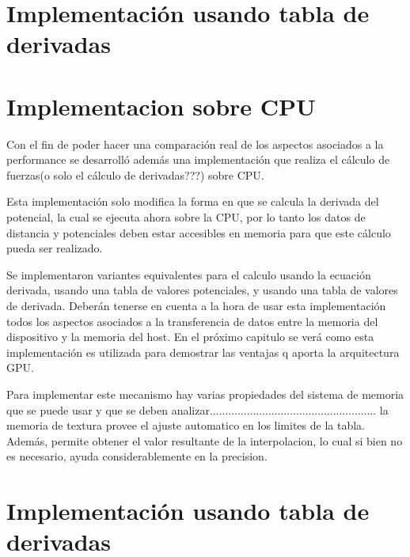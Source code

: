 \section{Implementación usando tabla de derivadas}
\section{Implementacion sobre CPU}
Con el fin de poder hacer una comparación real de los aspectos asociados a la performance se desarrolló además una implementación que realiza el cálculo de fuerzas(o solo el cálculo de derivadas???) sobre CPU.

Esta implementación solo modifica la forma en que se calcula la derivada del potencial, la cual se ejecuta ahora sobre la CPU, por lo tanto los datos de distancia y potenciales deben estar accesibles en memoria para que este cálculo pueda ser realizado.

Se implementaron variantes equivalentes para el calculo usando la ecuación derivada, usando una tabla de valores potenciales, y usando una tabla de valores de derivada.
Deberán tenerse en cuenta a la hora de usar esta implementación todos los aspectos asociados a la transferencia de datos entre la memoria del dispositivo y la memoria del host. En el próximo capitulo se verá como esta implementación es utilizada para demostrar las ventajas q aporta la arquitectura GPU.


Para implementar este mecanismo hay varias propiedades del sistema de memoria que se puede usar y que se deben analizar......................................................
la memoria de textura provee el ajuste automatico en los limites de la tabla. Además, permite obtener el valor resultante de la interpolacion, lo cual si bien no es necesario, ayuda considerablemente en la precision.



\section{Implementación usando tabla de derivadas}


